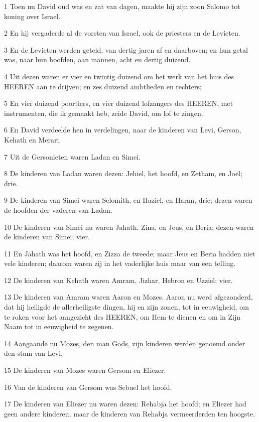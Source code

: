 \par 1 Toen nu David oud was en zat van dagen, maakte hij zijn zoon Salomo tot koning over Israel.
\par 2 En hij vergaderde al de vorsten van Israel, ook de priesters en de Levieten.
\par 3 En de Levieten werden geteld, van dertig jaren af en daarboven; en hun getal was, naar hun hoofden, aan mannen, acht en dertig duizend.
\par 4 Uit dezen waren er vier en twintig duizend om het werk van het huis des HEEREN aan te drijven; en zes duizend ambtlieden en rechters;
\par 5 En vier duizend poortiers, en vier duizend lofzangers des HEEREN, met instrumenten, die ik gemaakt heb, zeide David, om lof te zingen.
\par 6 En David verdeelde hen in verdelingen, naar de kinderen van Levi, Gerson, Kehath en Merari.
\par 7 Uit de Gersonieten waren Ladan en Simei.
\par 8 De kinderen van Ladan waren dezen: Jehiel, het hoofd, en Zetham, en Joel; drie.
\par 9 De kinderen van Simei waren Selomith, en Haziel, en Haran, drie; dezen waren de hoofden der vaderen van Ladan.
\par 10 De kinderen van Simei nu waren Jahath, Zina, en Jeus, en Beria; dezen waren de kinderen van Simei; vier.
\par 11 En Jahath was het hoofd, en Zizza de tweede; maar Jeus en Beria hadden niet vele kinderen; daarom waren zij in het vaderlijke huis maar van een telling.
\par 12 De kinderen van Kehath waren Amram, Jizhar, Hebron en Uzziel; vier.
\par 13 De kinderen van Amram waren Aaron en Mozes. Aaron nu werd afgezonderd, dat hij heiligde de allerheiligste dingen, hij en zijn zonen, tot in eeuwigheid, om te roken voor het aangezicht des HEEREN, om Hem te dienen en om in Zijn Naam tot in eeuwigheid te zegenen.
\par 14 Aangaande nu Mozes, den man Gods, zijn kinderen werden genoemd onder den stam van Levi.
\par 15 De kinderen van Mozes waren Gersom en Eliezer.
\par 16 Van de kinderen van Gersom was Sebuel het hoofd.
\par 17 De kinderen van Eliezer nu waren dezen: Rehabja het hoofd; en Eliezer had geen andere kinderen, maar de kinderen van Rehabja vermeerderden ten hoogste.
